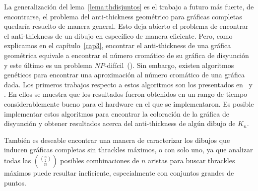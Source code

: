La generalización del lema~\ref{lema:thdisjuntos} es el trabajo a futuro más fuerte, de encontrarse, el
problema del anti-thickness geométrico para gráficas completas quedaría resuelto de manera general. Esto
deja abierto el problema de encontrar el anti-thickness de un dibujo en específico de manera eficiente.
Pero, como explicamos en el capítulo~\ref{cap3}, encontrar el anti-thickness de una gráfica geométrica
equivale a encontrar el número cromático de su gráfica de disyunción y este último es un problema
$NP$-difícil~(\cite{Skiena2003}). Sin embargo, existen algoritmos genéticos para encontrar una aproximación
al número cromático de una gráfica dada. Los primeros trabajos respecto a estos algoritmos son los
presentados en~\cite{Fleurent1996} y \cite{Galinier1999}. En ellos se muestra que los resultados fueron
obtenidos en un rango de tiempo considerablemente bueno para el hardware en el que se implementaron. Es
posible implementar estos algoritmos para encontrar la coloración de la gráfica de disyunción y obtener
resultados acerca del anti-thickness de algún dibujo de $K_n$.

También es deseable encontrar una manera de caracterizar los dibujos que inducen gráficas completas sin
thrackles máximos, o con solo uno, ya que analizar todas las $\displaystyle \binom{\binom{n}{2}}{n}$
posibles combinaciones de $n$ aristas para buscar thrackles máximos puede resultar ineficiente,
especialmente con conjuntos grandes de puntos.
